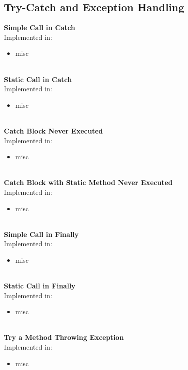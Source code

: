 \documentclass{article}
\begin{document}
\subsection{Try-Catch and Exception Handling}

\textbf{Simple Call in Catch}\\
Implemented in: 
\begin{itemize}
    \item misc
\end{itemize}
\\%

\noindent
\textbf{Static Call in Catch}\\
Implemented in: 
\begin{itemize}
    \item misc
\end{itemize}
\\%

\noindent
\textbf{Catch Block Never Executed}\\
Implemented in: 
\begin{itemize}
    \item misc
\end{itemize}
\\%

\noindent
\textbf{Catch Block with Static Method Never Executed}\\
Implemented in: 
\begin{itemize}
    \item misc
\end{itemize}
\\%

\noindent
\textbf{Simple Call in Finally}\\
Implemented in: 
\begin{itemize}
    \item misc
\end{itemize}
\\%

\noindent
\textbf{Static Call in Finally}\\
Implemented in: 
\begin{itemize}
    \item misc
\end{itemize}
\\%

\noindent
\textbf{Try a Method Throwing Exception}\\
Implemented in: 
\begin{itemize}
    \item misc
\end{itemize}
\\%
\end{document}
